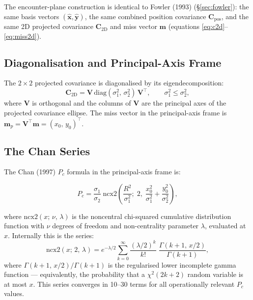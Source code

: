 \documentclass[11pt]{article}
\begin{document}
The encounter-plane construction is identical to Fowler (1993)
(\S\ref{sec:fowler}): the same basis vectors $(\hat{\mathbf{x}},
\hat{\mathbf{y}})$, the same combined position covariance $\mathbf{C}_\text{pos}$,
and the same 2D projected covariance $\mathbf{C}_\text{2D}$ and miss vector
$\mathbf{m}$ (equations \eqref{eq:c2d}--\eqref{eq:miss2d}).

\subsection{Diagonalisation and Principal-Axis Frame}

The $2\times2$ projected covariance is diagonalised by its eigendecomposition:
\begin{equation}
  \mathbf{C}_\text{2D} = \mathbf{V}\,\mathrm{diag}(\sigma_1^2,\,\sigma_2^2)\,\mathbf{V}^\top,
  \qquad \sigma_1^2 \le \sigma_2^2,
\end{equation}
where $\mathbf{V}$ is orthogonal and the columns of $\mathbf{V}$ are the
principal axes of the projected covariance ellipse.  The miss vector in the
principal-axis frame is $\mathbf{m}_p = \mathbf{V}^\top \mathbf{m} =
(x_0,\, y_0)^\top$.

\subsection{The Chan Series}

The Chan (1997) $P_c$ formula in the principal-axis frame is:

\begin{equation}
  \boxed{
  P_c = \frac{\sigma_1}{\sigma_2}\;
    \mathrm{ncx2}\!\left(\frac{R^2}{\sigma_1^2};\; 2,\;
    \frac{x_0^2}{\sigma_1^2} + \frac{y_0^2}{\sigma_2^2}\right),}
  \label{eq:chan_pc}
\end{equation}

where $\mathrm{ncx2}(x;\,\nu,\,\lambda)$ is the noncentral chi-squared
cumulative distribution function with $\nu$ degrees of freedom and
non-centrality parameter $\lambda$, evaluated at $x$.  Internally this is the
series:
\begin{equation}
  \mathrm{ncx2}(x;\,2,\,\lambda)
  = e^{-\lambda/2} \sum_{k=0}^{\infty}
    \frac{(\lambda/2)^k}{k!}\;
    \frac{\Gamma(k+1,\,x/2)}{\Gamma(k+1)},
  \label{eq:ncx2_series}
\end{equation}
where $\Gamma(k+1,\,x/2) / \Gamma(k+1)$ is the regularised lower incomplete
gamma function — equivalently, the probability that a $\chi^2(2k+2)$ random
variable is at most $x$.  This series converges in 10--30 terms for all
operationally relevant $P_c$ values.
\end{document}
